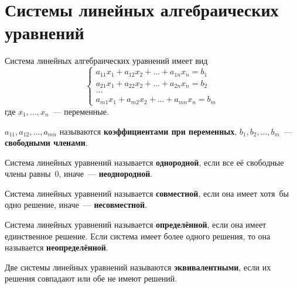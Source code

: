 \section{Системы линейных алгебраических уравнений}
 Система линейных алгебраических уравнений имеет вид
\begin{equation*}
\begin{cases}
a_{11} x_1 + a_{12} x_2 + \dots + a_{1n} x_n = b_1 \\
a_{21} x_1 + a_{22} x_2 + \dots + a_{2n} x_n = b_2 \\
\ldots \\
a_{m1} x_1 + a_{m2} x_2 + \dots + a_{mn} x_n = b_m
\end{cases}
\end{equation*}
где $x_1, \ldots, x_n$~--- переменные.

$a_{11}, a_{12}, \ldots, a_{mn}$ называются \textbf{коэффициентами при переменных}, $b_1, b_2, \dots, b_m$~--- \textbf{свободными членами}.

Система линейных уравнений называется \textbf{однородной}, если все её свободные члены равны~$0$, иначе~--- \textbf{неоднородной}.

Система линейных уравнений называется \textbf{совместной}, если она имеет хотя~бы одно решение, иначе~--- \textbf{несовместной}.

Система линейных уравнений называется \textbf{определённой}, если она имеет единственное решение.
Если система имеет более одного решения, то она называется \textbf{неопределённой}.

Две системы линейных уравнений называются \textbf{эквивалентными}, если их решения совпадают или обе не имеют решений.